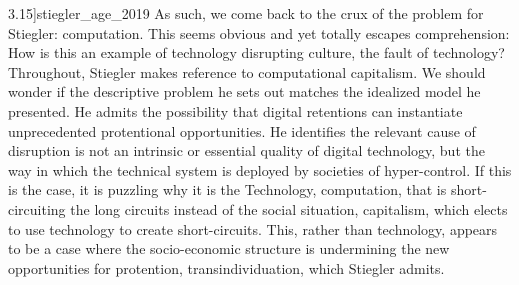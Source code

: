 \documentclass[letterpaper,notitlepage,12pt]{article}
\begin{document}
3.15]{stiegler_age_2019}
As such, we come back to the crux of the problem for Stiegler: computation.
This seems obvious and yet totally escapes comprehension: How is this an example
of technology disrupting culture, the fault of technology?
Throughout, Stiegler makes reference to computational capitalism.
We should wonder if the descriptive problem he sets out matches the idealized
model he presented.
He admits the possibility that digital retentions can instantiate unprecedented
protentional opportunities.
He identifies the relevant cause of disruption is not an intrinsic or essential
quality of digital technology, but the way in which the technical system is
deployed by societies of hyper-control.
If this is the case, it is puzzling why it is the Technology, computation, that
is short-circuiting the long circuits instead of the social situation,
capitalism, which elects to use technology to create short-circuits.
This, rather than technology, appears to be a case where the socio-economic
structure is undermining the new opportunities for protention,
transindividuation, which Stiegler admits.
\end{document}
